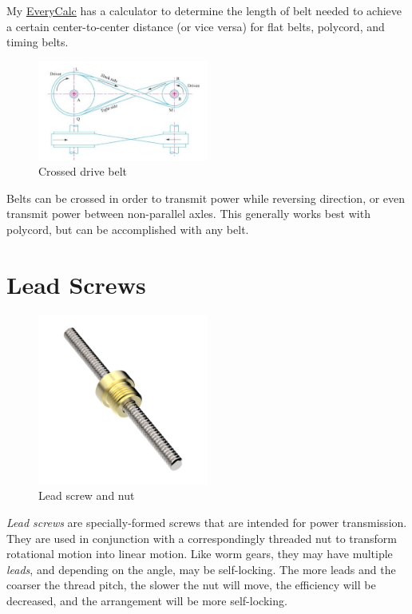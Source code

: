 My \href{http://thaddeus-maximus.github.io/swissarmyengineer/}{\color{red}\underline{EveryCalc}} has a calculator to determine the length of belt needed to achieve a certain center-to-center distance (or vice versa) for flat belts, polycord, and timing belts.

\begin{figure}[H]
	\includegraphics[width=0.5\textwidth]{imgs/belt_crossed.png}
	\caption{Crossed drive belt}
\end{figure}
	Belts can be crossed in order to transmit power while reversing direction, or even transmit power between non-parallel axles. This generally works best with polycord, but can be accomplished with any belt.
	
\section{Lead Screws}
\begin{figure}[H]
	\includegraphics[width=0.5\textwidth]{imgs/lead_screw.png}
	\caption{Lead screw and nut}
\end{figure}

\textit{Lead screws} are specially-formed screws that are intended for power transmission. They are used in conjunction with a correspondingly threaded nut to transform rotational motion into linear motion. Like worm gears, they may have multiple \textit{leads}, and depending on the angle, may be self-locking. The more leads and the coarser the thread pitch, the slower the nut will move, the efficiency will be decreased, and the arrangement will be more self-locking.

